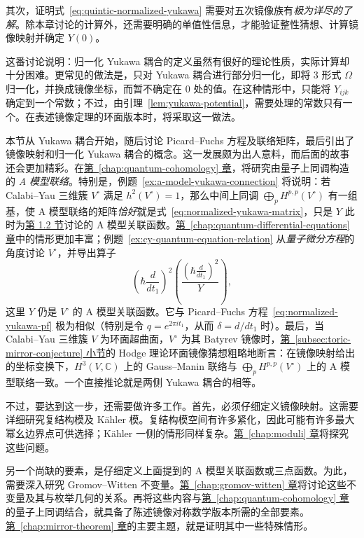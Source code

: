 其次，证明式~\eqref{eq:quintic-normalized-yukawa} 需要对五次镜像族有\emph{极为详尽的了解}。除本章讨论的计算外，还需要明确的单值性信息，才能验证整性猜想、计算镜像映射并确定 $Y(0)$。

这番讨论说明：归一化 Yukawa 耦合的定义虽然有很好的理论性质，实际计算却十分困难。更常见的做法是，只对 Yukawa 耦合进行部分归一化，即将 $3$ 形式 $\Omega$ 归一化，并换成镜像坐标，而暂不确定在 $0$ 处的值。在这种情形中，只能将 $Y_{ijk}$ 确定到一个常数；不过，由引理~\ref{lem:yukawa-potential}，需要处理的常数只有一个。在表述镜像定理的环面版本时，将采取这一做法。

本节从 Yukawa 耦合开始，随后讨论 Picard--Fuchs 方程及联络矩阵，最后引出了镜像映射和归一化 Yukawa 耦合的概念。这一发展颇为出人意料，而后面的故事还会更加精彩。在\hyperref[chap:quantum-cohomology]{第~\ref*{chap:quantum-cohomology} 章}，将研究由量子上同调构造的 \emph{A 模型联络}。特别是，例题~\ref{ex:a-model-yukawa-connection} 将说明：若 Calabi--Yau 三维簇 $V^\circ$ 满足 $h^2(V^\circ)=1$，那么中间上同调 $\bigoplus_pH^{p,p}(V^\circ)$ 有一组基，使 A 模型联络的矩阵\emph{恰好}就是式~\eqref{eq:normalized-yukawa-matrix}，只是 $Y$ 此时为\hyperref[sec:three-point]{第 1.2 节}讨论的 A 模型关联函数。\hyperref[chap:quantum-differential-equations]{第~\ref*{chap:quantum-differential-equations} 章}中的情形更加丰富；例题~\ref{ex:cy-quantum-equation-relation} 从\emph{量子微分方程}的角度讨论 $V^\circ$，并导出算子
\[
\left(\hbar\frac d{dt_1}\right)^2
\left(\frac{\left(\hbar\frac d{dt_1}\right)^2}{Y}\right),
\]
这里 $Y$ 仍是 $V^\circ$ 的 A 模型关联函数。它与 Picard--Fuchs 方程~\eqref{eq:normalized-yukawa-pf} 极为相似（特别是令 $q=e^{2\pi i t_1}$，从而 $\delta=d/dt_1$ 时）。最后，当 Calabi--Yau 三维簇 $V$ 为环面超曲面，$V^\circ$ 为其 Batyrev 镜像时，\hyperref[subsec:toric-mirror-conjecture]{第~\ref*{subsec:toric-mirror-conjecture} 小节}的 Hodge 理论环面镜像猜想粗略地断言：在镜像映射给出的坐标变换下，$H^3(V,\mathbb C)$ 上的 Gauss--Manin 联络与 $\bigoplus_pH^{p,p}(V^\circ)$ 上的 A 模型联络一致。一个直接推论就是两侧 Yukawa 耦合的相等。

不过，要达到这一步，还需要做许多工作。首先，必须仔细定义镜像映射。这需要详细研究复结构模及 Kähler 模。复结构模空间有许多紧化，因此可能有许多最大幂幺边界点可供选择；Kähler 一侧的情形同样复杂。\hyperref[chap:moduli]{第~\ref*{chap:moduli} 章}将探究这些问题。

另一个尚缺的要素，是仔细定义上面提到的 A 模型关联函数或三点函数。为此，需要深入研究 Gromov--Witten 不变量。\hyperref[chap:gromov-witten]{第~\ref*{chap:gromov-witten} 章}将讨论这些不变量及其与枚举几何的关系。再将这些内容与\hyperref[chap:quantum-cohomology]{第~\ref*{chap:quantum-cohomology} 章}的量子上同调结合，就具备了陈述镜像对称数学版本所需的全部要素。\hyperref[chap:mirror-theorem]{第~\ref*{chap:mirror-theorem} 章}的主要主题，就是证明其中一些特殊情形。

